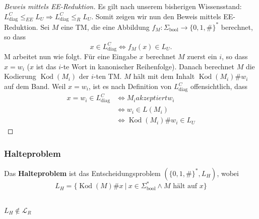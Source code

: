 \begin{proof}[Beweis mittels EE-Reduktion]
Es gilt nach unserem bisherigen Wissensstand: \( L_\text{diag}^C \leq_{EE} L_U \Rightarrow L_\text{diag}^C \leq_R L_U \). Somit zeigen wir nun den Beweis mittels EE-Reduktion. Sei \( M \) eine TM, die eine Abbildung \( f_M: \Sigma_\text{bool} \to \{0, 1, \# \}^* \) berechnet, so dass \[ x \in L_\text{diag}^C \Leftrightarrow f_M(x) \in L_U. \]
M arbeitet nun wie folgt. Für eine Eingabe \( x \) berechnet \( M \) zuerst ein \( i \), so dass \( x = w_i \) (\(x\) ist das \(i\)-te Wort in kanonischer Reihenfolge). Danach berechnet \( M \) die Kodierung \(\operatorname{Kod}(M_i)\) der \(i\)-ten TM. \( M \) hält mit dem Inhalt \(\operatorname{Kod}(M_i) \# w_i\) auf dem Band. Weil \( x = w_i \), ist es nach Definition von \( L_\text{diag}^C \) offensichtlich, dass
\begin{align*}
x = w_i \in L_\text{diag}^C &\Leftrightarrow M_i akzeptiert w_i\\
&\Leftrightarrow w_i \in L(M_i)\\
&\Leftrightarrow \operatorname{Kod}(M_i) \# w_i \in L_U
\end{align*}

\end{proof}

\subsubsection{Halteproblem}
\begin{definition}
Das \textbf{Halteproblem} ist das Entscheidungsproblem \( (\{0, 1, \#\}^*, L_H) \), wobei
\[
L_H = \{ \operatorname{Kod}(M) \# x \ |\ x \in \Sigma_\text{bool}^* \land M \text{ hält auf } x \}
\]\\
\end{definition}

\begin{satz}
\( L_H \notin \mathcal{L}_R \)\\
\end{satz}

